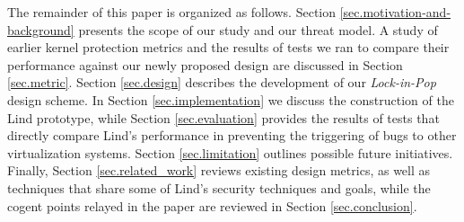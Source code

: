 The remainder of this paper is organized as follows.
Section \ref{sec.motivation-and-background} presents the scope of our study and our threat model. 
A study of earlier kernel protection metrics and the results of tests we ran to compare their performance 
against our newly proposed design are discussed in Section \ref{sec.metric}. 
Section \ref{sec.design} describes the development of our \emph{Lock-in-Pop} design scheme. 
In Section \ref{sec.implementation} we discuss the construction of the Lind prototype, 
while Section \ref{sec.evaluation} provides the  results of tests that directly compare Lind's performance 
in preventing the triggering of bugs to other virtualization systems. 
Section \ref{sec.limitation} outlines possible future initiatives. 
Finally, Section \ref{sec.related_work} reviews existing design metrics, as well as techniques that share some of Lind's security techniques and goals, 
while the cogent points relayed in the paper are reviewed in Section \ref{sec.conclusion}.